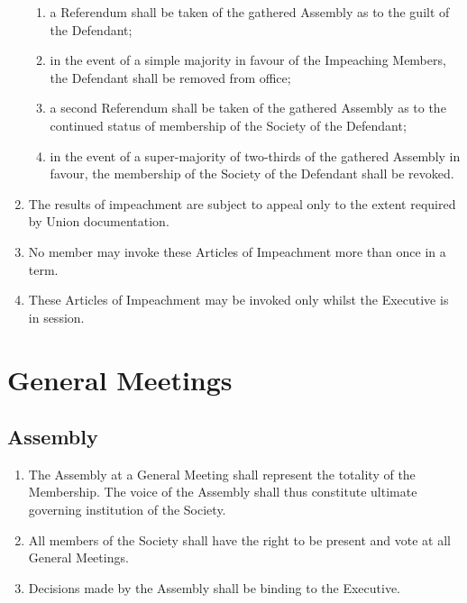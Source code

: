 \documentclass{scrartcl}
\begin{document}
\begin{enumerate}
\begin{enumerate}
                        \item a Referendum shall be taken of the gathered Assembly as to the guilt of the Defendant;
                        \item in the event of a simple majority in favour of the Impeaching Members, the Defendant shall be removed from office;
                        \item a second Referendum shall be taken of the gathered Assembly as to the continued status of membership of the Society of the Defendant;
                        \item in the event of a super-majority of two-thirds of the gathered Assembly in favour, the membership of the Society of the Defendant shall be revoked.
                    \end{enumerate}
                \item The results of impeachment are subject to appeal only to the extent required by Union documentation.
                \item No member may invoke these Articles of Impeachment more than once in a term.
                \item These Articles of Impeachment may be invoked only whilst the Executive is in session.
            \end{enumerate}

    \clearpage
    \section{General Meetings}
        \label{gm}
        \subsection{Assembly}
            \label{gm--assembly}
            \begin{enumerate}
                \item The Assembly at a General Meeting shall represent the totality of the Membership.
                    \subitem The voice of the Assembly shall thus constitute ultimate governing institution of the Society.
                \item All members of the Society shall have the right to be present and vote at all General Meetings.
                \item Decisions made by the Assembly shall be binding to the Executive.
            \end{enumerate}
\end{document}
